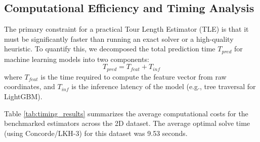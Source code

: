 \documentclass{article}
\begin{document}
\subsection{Computational Efficiency and Timing Analysis}
\label{subsec:timing_analysis}

The primary constraint for a practical Tour Length Estimator (TLE) is that it must be significantly faster than running an exact solver or a high-quality heuristic. To quantify this, we decomposed the total prediction time $T_{pred}$ for machine learning models into two components:
\begin{equation}
    T_{pred} = T_{feat} + T_{inf}
\end{equation}
where $T_{feat}$ is the time required to compute the feature vector from raw coordinates, and $T_{inf}$ is the inference latency of the model (e.g., tree traversal for LightGBM).

Table \ref{tab:timing_results} summarizes the average computational costs for the benchmarked estimators across the 2D dataset. The average optimal solve time (using Concorde/LKH-3) for this dataset was 9.53 seconds.
\end{document}
